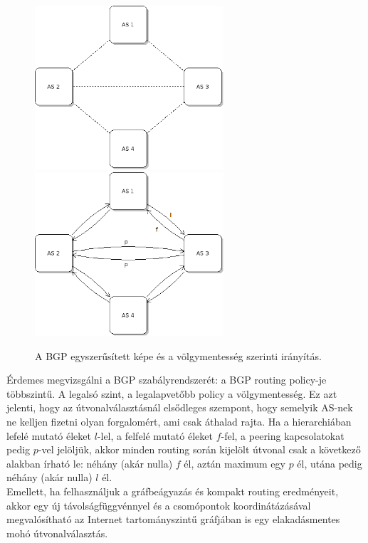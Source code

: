   \begin{figure}[!ht]
    \centering
    \includegraphics[width=70mm,keepaspectratio=true]{./figures/BGP_iranyitatlan.png}\hspace{5mm}
    \includegraphics[width=70mm,keepaspectratio=true]{./figures/BGP_iranyitott_labeled.png}
    \caption{A BGP egyszerűsített képe és a völgymentesség szerinti irányítás.}
    \label{fig:figure_BGP}
  \end{figure}

  Érdemes megvizsgálni a BGP szabályrendszerét: a BGP routing policy-je többszintű. A legalsó szint, a legalapvetőbb policy a völgymentesség. Ez azt jelenti, hogy az útvonalválasztásnál elsődleges szempont, hogy semelyik AS-nek ne kelljen fizetni olyan forgalomért, ami csak áthalad rajta. Ha a hierarchiában lefelé mutató éleket $l$-lel, a felfelé mutató éleket $f$-fel, a peering kapcsolatokat pedig $p$-vel jelöljük, akkor minden routing során kijelölt útvonal csak a következő alakban írható le: néhány (akár nulla) $f$ él, aztán maximum egy $p$ él, utána pedig néhány (akár nulla) $l$ él.\\

  Emellett, ha felhasználjuk a gráfbeágyazás és kompakt routing eredményeit, akkor egy új távolságfüggvénnyel és a csomópontok koordinátázásával megvalósítható az Internet tartományszintű gráfjában is egy elakadásmentes mohó útvonalválasztás\cite{DobreiBScSzakdolgozat}.

